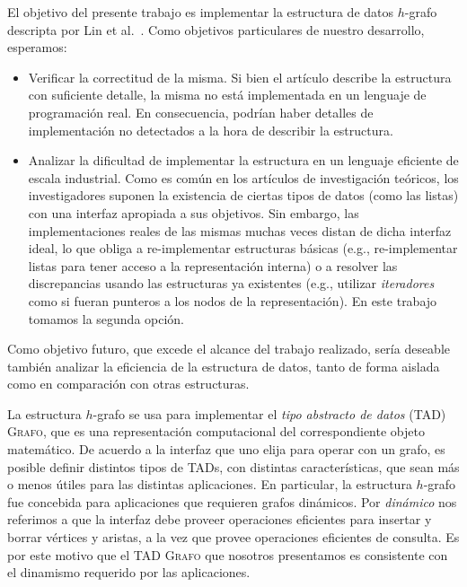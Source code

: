 \documentclass[%
    a4paper,%
    fontsize=12pt,%
    DIV=12,
    twoside,%
    openright,%
    titlepage=true,%
    headsepline,%
    toc=bibliography,%
    parskip=half,%
    cleardoublepage=empty,%
    headings=big,%
]{scrbook}
\newcommand{\Grafo}{\textsc{Grafo}\xspace}
\begin{document}
El objetivo del presente trabajo es implementar la estructura de datos $h$-grafo descripta por Lin et al.~\cite{LinSoulignacSzwarcfiterTCS2012}.   Como objetivos particulares de nuestro desarrollo, esperamos:
\begin{itemize}
  \item Verificar la correctitud de la misma.  Si bien el artículo describe la estructura con suficiente detalle, la misma no está implementada en un lenguaje de programación real.  En consecuencia, podrían haber detalles de implementación no detectados a la hora de describir la estructura.
  \item Analizar la dificultad de implementar la estructura en un lenguaje eficiente de escala industrial.  Como es común en los artículos de investigación teóricos, los investigadores suponen la existencia de ciertas tipos de datos (como las listas) con una interfaz apropiada a sus objetivos.  Sin embargo, las implementaciones reales de las mismas muchas veces distan de dicha interfaz ideal, lo que obliga a re-implementar estructuras básicas (e.g., re-implementar listas para tener acceso a la representación interna) o a resolver las discrepancias usando las estructuras ya existentes (e.g., utilizar \emph{iteradores} como si fueran punteros a los nodos de la representación).  En este trabajo tomamos la segunda opción.
\end{itemize}
Como objetivo futuro, que excede el alcance del trabajo realizado, sería deseable también analizar la eficiencia de la estructura de datos, tanto de forma aislada como en comparación con otras estructuras.

La estructura $h$-grafo se usa para implementar el \emph{tipo abstracto de datos} (TAD) \Grafo, que es una representación computacional del correspondiente objeto matemático.  De acuerdo a la interfaz que uno elija para operar con un grafo, es posible definir distintos tipos de TADs, con distintas características, que sean más o menos útiles para las distintas aplicaciones.  En particular, la estructura $h$-grafo fue concebida para aplicaciones que requieren grafos dinámicos.  Por \emph{dinámico} nos referimos a que la interfaz debe proveer operaciones eficientes para insertar y borrar vértices y aristas, a la vez que provee operaciones eficientes de consulta.  Es por este motivo que el TAD \Grafo que nosotros presentamos es consistente con el dinamismo requerido por las aplicaciones.  
\end{document}
